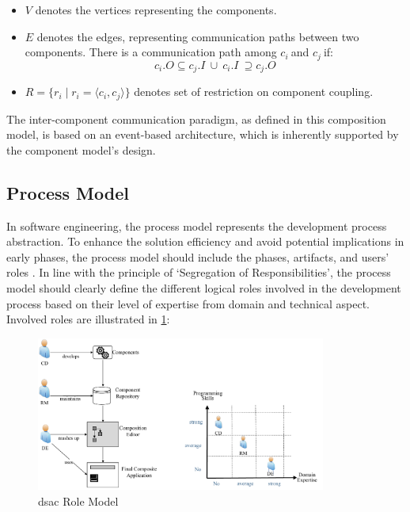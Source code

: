   \begin{itemize}
  \item
    \(V\) denotes the vertices representing the components.
  \item
    \(E\) denotes the edges, representing communication paths between
    two components. There is a communication path among \(c_{i}\ \)and
    \(c_{j}\ \)if:
    \[c_{i}.O \subseteq c_{j}.I\  \cup \ c_{i}.I\  \supseteq c_{j}.O\]  
  \item 
 \( R = \{ r_{i} \mid r_{i} = \langle c_{i}, c_{j} \rangle \} \) denotes set of
    restriction on component coupling.
  \end{itemize}
  
The inter-component communication paradigm, as defined in this composition model, is based on an event-based architecture, which is inherently supported by the component model’s design. 
  
\vspace{-10pt}
\hypertarget{sec:process-model}{%
\subsection{Process Model}\label{sec:process-model}}
\vspace{10pt}
In software engineering, the process model represents the development process abstraction. To enhance the solution efficiency and avoid potential implications in early phases, the process model should include the phases, artifacts, and users’ roles \autocite{Yu1994}. In line with the principle of ‘Segregation of Responsibilities’, the process model should clearly define the different logical roles involved in the development process based on their level of expertise from domain and technical aspect. Involved roles are illustrated in \cref{fig:role-model}:
\begin{figure}[hbt]
\hypertarget{fig:role-model}{%
\centering
\includegraphics[width=0.85\textwidth]{../figures/MyFigures/roles.drawio copy.pdf}
\captionsetup{justification=centering}
\caption{\gls{dsac} Role Model}\label{fig:role-model}
}
\end{figure}

